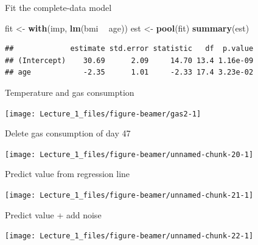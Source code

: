 \documentclass[ignorenonframetext,aspectratio=43]{beamer}
\newenvironment{Shaded}{\begin{snugshade}}{\end{snugshade}}
\newcommand{\KeywordTok}[1]{\textcolor[rgb]{0.13,0.29,0.53}{\textbf{#1}}}
\newcommand{\NormalTok}[1]{#1}
\newcommand{\OperatorTok}[1]{\textcolor[rgb]{0.81,0.36,0.00}{\textbf{#1}}}
\newcommand{\StringTok}[1]{\textcolor[rgb]{0.31,0.60,0.02}{#1}}
\begin{document}
\begin{frame}[fragile]{Fit the complete-data model}
\protect\hypertarget{fit-the-complete-data-model}{}

\begin{Shaded}
\begin{Highlighting}[]
\NormalTok{fit <-}\StringTok{ }\KeywordTok{with}\NormalTok{(imp, }\KeywordTok{lm}\NormalTok{(bmi }\OperatorTok{~}\StringTok{ }\NormalTok{age))}
\NormalTok{est <-}\StringTok{ }\KeywordTok{pool}\NormalTok{(fit)}
\KeywordTok{summary}\NormalTok{(est)}
\end{Highlighting}
\end{Shaded}

\begin{verbatim}
##             estimate std.error statistic   df  p.value
## (Intercept)    30.69      2.09     14.70 13.4 1.16e-09
## age            -2.35      1.01     -2.33 17.4 3.23e-02
\end{verbatim}

\end{frame}

\begin{frame}{Temperature and gas consumption}
\protect\hypertarget{temperature-and-gas-consumption}{}

\texttt{[image: Lecture\_1\_files/figure-beamer/gas2-1]}

\end{frame}

\begin{frame}{Delete gas consumption of day 47}
\protect\hypertarget{delete-gas-consumption-of-day-47}{}

\texttt{[image: Lecture\_1\_files/figure-beamer/unnamed-chunk-20-1]}

\end{frame}

\begin{frame}{Predict value from regression line}
\protect\hypertarget{predict-value-from-regression-line}{}

\texttt{[image: Lecture\_1\_files/figure-beamer/unnamed-chunk-21-1]}

\end{frame}

\begin{frame}{Predict value + add noise}
\protect\hypertarget{predict-value-add-noise}{}

\texttt{[image: Lecture\_1\_files/figure-beamer/unnamed-chunk-22-1]}

\end{frame}
\end{document}
